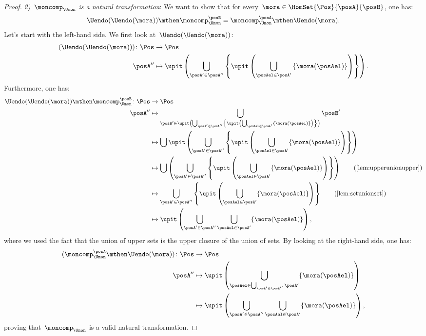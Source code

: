 \begin{proof}
  \emph{2)~$\moncomp_{\Umon}$ is a natural transformation}:
  We want to show that for every~$\mora\in \HomSet{\Pos}{\posA}{\posB}$, one has:
  \begin{equation}
    \Uendo(\Uendo(\mora))\mthen \moncomp_{\Umon}^{\posB}=\moncomp_{\Umon}^\posA \mthen \Uendo(\mora).
  \end{equation}
  Let's start with the left-hand side. We first look at~$\Uendo(\Uendo(\mora))$:
  \begin{equation}
    \begin{aligned}
      (\Uendo(\Uendo(\mora)))\colon \Pos&\to \Pos\\
      \posA''&\mapsto \upit \left( \bigcup_{\posA' \in \posA''}\left \{ \upit \left( \bigcup_{\posAel \in \posA'} \left\{ \mora(\posAel)\right\}\right)\right\}\right).
    \end{aligned}
  \end{equation}
  Furthermore, one has:
  \begin{equation}
  \begin{aligned}
    \Uendo(\Uendo(\mora))\mthen \moncomp_{\Umon}^{\posB}\colon \Pos&\to \Pos\\
    \posA''&\mapsto \bigcup_{\posB'\in \upit \left( \bigcup_{\posA'\in \posA''} \left\{ \upit \left( \bigcup_{\posAel \in \posA'} \{ \mora(\posAel)\}\right)\right\} \right)} \posB'\\
    &\mapsto \bigcup \upit \left( \bigcup_{\posA'\in \posA''} \left\{ \upit \left( \bigcup_{\posAel \in \posA'} \{ \mora(\posAel)\}\right)\right\} \right)\\
    &\mapsto \bigcup  \left( \bigcup_{\posA'\in \posA''} \left\{ \upit \left( \bigcup_{\posAel \in \posA'} \{ \mora(\posAel)\}\right)\right\} \right) \quad \quad (\text{\cref{lem:upperunionupper}})\\
    &\mapsto   \bigcup_{\posA'\in \posA''} \left\{ \upit \left( \bigcup_{\posAel \in \posA'} \{ \mora(\posAel)\}\right)\right\} \quad \quad (\text{\cref{lem:setunionset}})\\
    &\mapsto   \upit \left(\bigcup_{\posA'\in \posA''}  \bigcup_{\posAel \in \posA'} \{ \mora(\posAel)\}\right),
  \end{aligned}
  \end{equation}
  where we used the fact that the union of upper sets is the upper closure of the union of sets. By looking at the right-hand side, one has:
  \begin{equation}
  \begin{aligned}
    (\moncomp_{\Umon}^\posA \mthen \Uendo(\mora))\colon \Pos &\to \Pos\\
    \posA''&\mapsto \upit \left( \bigcup_{\posAel \in \bigcup_{\posA'\in \posA''}\posA'} \{ \mora(\posAel)\}\right)\\
    &\mapsto \upit \left( \bigcup_{\posA'\in \posA''}\bigcup_{\posAel \in \posA'}\{\mora(\posAel)\}\right),
  \end{aligned}
  \end{equation}
  proving that~$\moncomp_{\Umon}$ is a valid natural transformation.


\end{proof}
